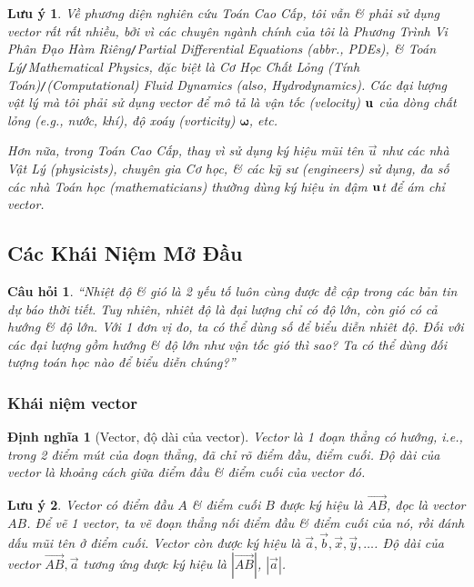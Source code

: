 \documentclass{article}
\numberwithin{equation}{section}
\newtheorem{definition}{Định nghĩa}[section]
\newtheorem{remark}{Lưu ý}[section]
\newtheorem{question}{Câu hỏi}[section]
\begin{document}
\begin{remark}
	Về phương diện nghiên cứu Toán Cao Cấp, tôi vẫn \& phải sử dụng vector rất rất nhiều, bởi vì các chuyên ngành chính của tôi là Phương Trình Vi Phân Đạo Hàm Riêng\emph{\texttt{/}}Partial Differential Equations (abbr., PDEs), \& Toán Lý\emph{\texttt{/}}Mathematical Physics, đặc biệt là Cơ Học Chất Lỏng (Tính Toán)\emph{\texttt{/}}(Computational) Fluid Dynamics (also, Hydrodynamics). Các đại lượng vật lý mà tôi phải sử dụng vector để mô tả là vận tốc (velocity) ${\bf u}$ của dòng chất lỏng (e.g., nước, khí), độ xoáy (vorticity) $\boldsymbol{\omega}$, etc.
	
	Hơn nữa, trong Toán Cao Cấp, thay vì sử dụng ký hiệu mũi tên $\vec{u}$ như các nhà Vật Lý (physicists), chuyên gia Cơ học, \& các kỹ sư (engineers) sử dụng, đa số các nhà Toán học (mathematicians) thường dùng ký hiệu in đậm ${\bf u}$t để ám chỉ vector.
\end{remark}

\subsection{Các Khái Niệm Mở Đầu}

\begin{question}
	``Nhiệt độ \& gió là 2 yếu tố luôn cùng được đề cập trong các bản tin dự báo thời tiết. Tuy nhiên, nhiêt độ là đại lượng chỉ có độ lớn, còn gió có cả hướng \& độ lớn. Với 1 đơn vị đo, ta có thể dùng số để biểu diễn nhiêt độ. Đối với các đại lượng gồm hướng \& độ lớn như vận tốc gió thì sao? Ta có thể dùng đối tượng toán học nào để biểu diễn chúng?''
\end{question}

\subsubsection{Khái niệm vector}

\begin{definition}[Vector, độ dài của vector]
	\emph{Vector} là 1 đoạn thẳng có hướng, i.e., trong 2 điểm mút của đoạn thẳng, đã chỉ rõ điểm đầu, điểm cuối. \emph{Độ dài của vector} là khoảng cách giữa điểm đầu \& điểm cuối của vector đó.
\end{definition}

\begin{remark}
	Vector có điểm đầu $A$ \& điểm cuối $B$ được ký hiệu là $\vec{AB}$, đọc là \emph{vector $AB$}. Để vẽ 1 vector, ta vẽ đoạn thẳng nối điểm đầu \& điểm cuối của nó, rồi đánh dấu mũi tên ở điểm cuối. Vector còn được ký hiệu là $\vec{a},\vec{b},\vec{x},\vec{y},\ldots$. Độ dài của vector $\overrightarrow{AB},\vec{a}$ tương ứng được ký hiệu là $|\overrightarrow{AB}|$, $|\vec{a}|$.
\end{remark}
\end{document}
